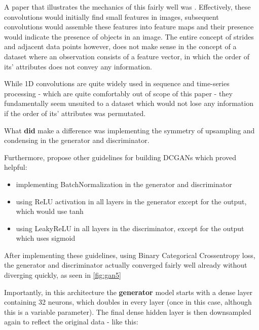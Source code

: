 A paper that illustrates the mechanics of this fairly well was \cite{convolution_arithmetic}. Effectively, these convolutions would initially find small features in images, subsequent convolutions would assemble these features into feature maps and their presence would indicate the presence of objects in an image. The entire concept of strides and adjacent data points however, does not make sense in the concept of a dataset where an observation consists of a feature vector, in which the order of its' attributes does not convey any information. 

\pagebreak

While 1D convolutions are quite widely used in sequence and time-series processing - which are quite comfortably out of scope of this paper - they fundamentally seem unsuited to a dataset which would not lose any information if the order of its' attributes was permutated.

What \textbf{did} make a difference was implementing the symmetry of upsampling and condensing in the generator and discriminator.

Furthermore, \cite{dcgan} propose other guidelines for building \acp{DCGAN} which proved helpful:

\begin{itemize}
	\item implementing BatchNormalization in the generator and discriminator \cite{batchnorm}
	\item using ReLU activation in all layers in the generator except for the output, which would use tanh
	\item using LeakyReLU in all layers in the discriminator, except for the output which uses sigmoid
\end{itemize}

\clearpage

After implementing these guidelines, using Binary Categorical Crossentropy loss, the generator and discriminator actually converged fairly well already without diverging quickly, as seen in \ref{fig:gan5}


Importantly, in this architecture the \textbf{generator} model starts with a dense layer containing 32 neurons, which doubles in every layer (once in this case, although this is a variable parameter). The final dense hidden layer is then downsampled again to reflect the original data - like this:

